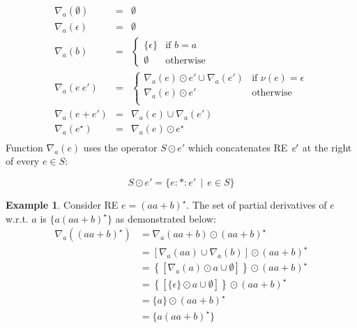\documentclass[fleqn,10pt]{SelfArx} %
\theoremstyle{definition}
\newtheorem{Example}{Example}
\newcommand{\V}[1]{\purple{\mathit{#1}}}
\begin{document}
\[
\begin{array}{lclr}
  \nabla_a(\emptyset) & = & \emptyset\\
  \nabla_a(\epsilon) & = & \emptyset \\
  \nabla_a(b) & = & \left\{
                      \begin{array}{lr}
                        \{\epsilon\} & \text{if } b = a\\
                        \emptyset & \text{otherwise}
                      \end{array}
                                \right.\\
  \nabla_a(e\:e') & = & \left \{
                           \begin{array}{lr}
                              \nabla_a(e) \odot e' \cup \nabla_a(e') & \text{if }\nu(e) = \epsilon \\
                              \nabla_a(e) \odot e' & \text{otherwise} \\
                           \end{array} \right . \\
  \nabla_a(e + e') & = & \nabla_a(e) \cup \nabla_a(e') \\
  \nabla_a(e^\star) & = & \nabla_a(e) \odot e^\star\\
\end{array}
\]
Function $\nabla_a(e)$ uses the operator $S \odot e'$ which concatenates RE \ensuremath{\V{e'}} at the right of every $e \in S$:

\[
  S \odot e' = \{e :*: e'\,\mid\, e \in S\}
\]

\begin{Example}
    Consider RE $e = (aa + b)^\star$. The set of partial derivatives of $e$ w.r.t. $a$ is 
    $\{a(aa + b)^\star\}$ as demonstrated below:
    \begin{align*}
        \nabla_a((aa + b)^\star) &= \nabla_a(aa + b) \odot (aa + b)^\star \\
                                 &= \left\lbrack \nabla_a(aa) \cup \nabla_a(b)\right\rbrack \odot (aa + b)^\star \\
                                 &= \left\{\left\lbrack \nabla_a(a) \odot a \cup \emptyset\right\rbrack \right\}\odot (aa + b)^\star \\
                                 &= \left\{\left\lbrack \{\epsilon\} \odot a \cup \emptyset\right\rbrack \right\}\odot (aa + b)^\star \\
                                 &= \{a\} \odot (aa + b)^\star \\
                                 &= \{a(aa + b)^\star\}
    \end{align*}
\end{Example}    
\end{document}

